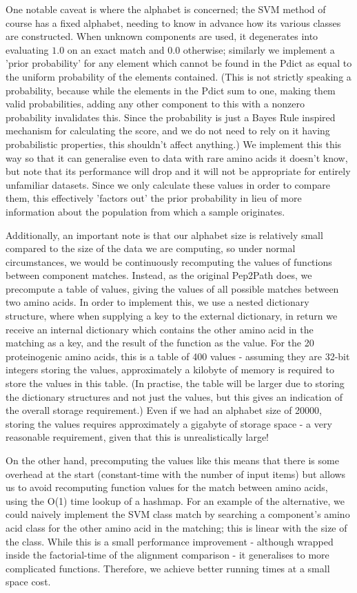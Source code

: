 \documentclass{l4proj}
\begin{document}
One notable caveat is where the alphabet is concerned; the SVM method of course has a fixed alphabet, needing to know in advance how its various classes are constructed. When unknown components are used, it degenerates into evaluating \(1.0\) on an exact match and \(0.0\) otherwise; similarly we implement a 'prior probability' for any element which cannot be found in the Pdict as equal to the uniform probability of the elements contained. (This is not strictly speaking a probability, because while the elements in the Pdict sum to one, making them valid probabilities, adding any other component to this with a nonzero probability invalidates this. Since the probability is just a Bayes Rule inspired mechanism for calculating the score, and we do not need to rely on it having probabilistic properties, this shouldn't affect anything.)  We implement this this way so that it can generalise even to data with rare amino acids it doesn't know, but note that its performance will drop and it will not be appropriate for entirely unfamiliar datasets. Since we only calculate these values in order to compare them, this effectively 'factors out' the prior probability in lieu of more information about the population from which a sample originates.

Additionally, an important note is that our alphabet size is relatively small compared to the size of the data we are computing, so under normal circumstances, we would be continuously recomputing the values of functions between component matches. Instead, as the original Pep2Path does, we precompute a table of values, giving the values of all possible matches between two amino acids. In order to implement this, we use a nested dictionary structure, where when supplying a key to the external dictionary, in return we receive an internal dictionary which contains the other amino acid in the matching as a key, and the result of the function as the value. For the 20 proteinogenic amino acids, this is a table of 400 values - assuming they are 32-bit integers storing the values, approximately a kilobyte of memory is required to store the values in this table. (In practise, the table will be larger due to storing the dictionary structures and not just the values, but this gives an indication of the overall storage requirement.) Even if we had an alphabet size of 20000, storing the values requires approximately a gigabyte of storage space - a very reasonable requirement, given that this is unrealistically large!

On the other hand, precomputing the values like this means that there is some overhead at the start (constant-time with the number of input items) but allows us to avoid recomputing function values for the match between amino acids, using the O(1) time lookup of a hashmap. For an example of the alternative, we could naively implement the SVM class match by searching a component's amino acid class for the other amino acid in the matching; this is linear with the size of the class. While this is a small performance improvement - although wrapped inside the factorial-time of the alignment comparison - it generalises to more complicated functions. Therefore, we achieve better running times at a small space cost.
\end{document}
